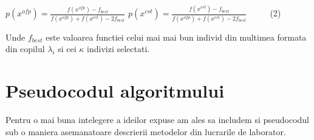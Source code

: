 \documentclass[a4paper]{article}
\begin{document}
\LARGE
\centerline{ $p(x^{ofp}) = \frac{f(x^{ofp}) - f_{best}}{f(x^{ofp}) + f(x^{cst}) - 2f_{best}}$ \hspace{1cm} $p(x^{cst}) = \frac{f(x^{cst}) - f_{best}}{f(x^{ofp}) + f(x^{cst}) - 2f_{best}}$ $ \hspace{1cm}$(2)} \vspace{5mm}

\Large
Unde $f_{best}$ este valoarea functiei celui mai mai bun individ din multimea formata din copilul $\lambda_i$ si cei $\kappa$ indivizi selectati.


\section{Pseudocodul algoritmului}
\Large
Pentru o mai buna intelegere a ideilor expuse am ales sa includem si pseudocodul sub o maniera asemanatoare descrierii metodelor din lucrarile de laborator. 
\end{document}
